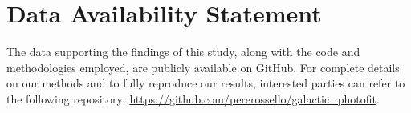 \section*{Data Availability Statement}
The data supporting the findings of this study, along with the code and methodologies employed, are publicly available on GitHub. For complete details on our methods and to fully reproduce our results, interested parties can refer to the following repository: \url{https://github.com/pererossello/galactic_photofit}.